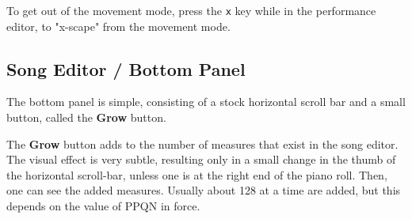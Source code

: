    To get out of the movement mode, press the
   \texttt{x} key while in the performance editor, to "x-scape" from the
   movement mode.

\subsection{Song Editor / Bottom Panel}
\label{subsec:seq64_song_editor_bottom}

   The bottom panel is simple, consisting of a stock horizontal scroll bar
   and a small button, called the \textbf{Grow} button.

   The \textbf{Grow} button adds to the number of measures that exist
   in the song editor. The visual effect is very subtle, resulting only
   in a small change in the thumb of the horizontal scroll-bar, unless one
   is at the right end of the piano roll.  Then, one can see the added
   measures.  Usually about 128 at a time are added, but this depends on the
   value of PPQN in force.

